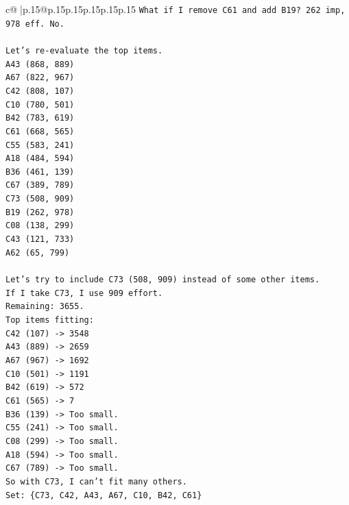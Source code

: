 \documentclass{article}
\begin{document}
{\begin{supertabular}{c@{$\;$}|p{.15\linewidth}@{}p{.15\linewidth}p{.15\linewidth}p{.15\linewidth}p{.15\linewidth}p{.15\linewidth}}
{{{\texttt{What if I remove C61 and add B19? 262 imp, 978 eff. No.} \\
\\ 
\texttt{Let's re{-}evaluate the top items.} \\
\texttt{A43 (868, 889)} \\
\texttt{A67 (822, 967)} \\
\texttt{C42 (808, 107)} \\
\texttt{C10 (780, 501)} \\
\texttt{B42 (783, 619)} \\
\texttt{C61 (668, 565)} \\
\texttt{C55 (583, 241)} \\
\texttt{A18 (484, 594)} \\
\texttt{B36 (461, 139)} \\
\texttt{C67 (389, 789)} \\
\texttt{C73 (508, 909)} \\
\texttt{B19 (262, 978)} \\
\texttt{C08 (138, 299)} \\
\texttt{C43 (121, 733)} \\
\texttt{A62 (65, 799)} \\
\\ 
\texttt{Let's try to include C73 (508, 909) instead of some other items.} \\
\texttt{If I take C73, I use 909 effort.} \\
\texttt{Remaining: 3655.} \\
\texttt{Top items fitting:} \\
\texttt{C42 (107) {-}> 3548} \\
\texttt{A43 (889) {-}> 2659} \\
\texttt{A67 (967) {-}> 1692} \\
\texttt{C10 (501) {-}> 1191} \\
\texttt{B42 (619) {-}> 572} \\
\texttt{C61 (565) {-}> 7} \\
\texttt{B36 (139) {-}> Too small.} \\
\texttt{C55 (241) {-}> Too small.} \\
\texttt{C08 (299) {-}> Too small.} \\
\texttt{A18 (594) {-}> Too small.} \\
\texttt{C67 (789) {-}> Too small.} \\
\texttt{So with C73, I can't fit many others.} \\
\texttt{Set: \{C73, C42, A43, A67, C10, B42, C61\}} \\
}}}
\end{supertabular}}
\end{document}
